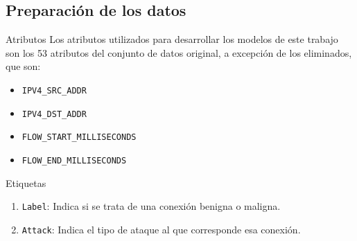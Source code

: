 \subsection{Preparación de los datos}

\begin{frame}{Atributos}
	Los atributos utilizados para desarrollar los modelos de este trabajo son los 53 atributos del conjunto de datos original, a excepción de los eliminados, que son:
	\begin{itemize}
		\item \texttt{IPV4\_SRC\_ADDR}
		\item \texttt{IPV4\_DST\_ADDR}
		\item \texttt{FLOW\_START\_MILLISECONDS}
		\item \texttt{FLOW\_END\_MILLISECONDS}
	\end{itemize}
\end{frame}

\begin{frame}{Etiquetas}
	\begin{enumerate}
		\item \texttt{Label}: Indica si se trata de una conexión benigna o maligna.
		\item \texttt{Attack}: Indica el tipo de ataque al que corresponde esa conexión.
	\end{enumerate}
\end{frame}

